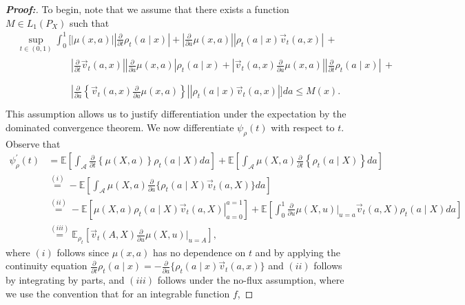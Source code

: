 \documentclass[11pt,twoside]{article}
\theoremstyle{definition}
\theoremstyle{remark}
\begin{document}
\begin{proof}[\textbf{Proof:}]

To begin, note that we assume that there exists a function $M \in L_1(P_X)$ such that
\begin{align*}
    &\sup_{t\in (0, 1)}\int_0^1
    \Bigg[|\mu(x,a)| \left| \frac{\partial}{\partial t} \rho_t(a\mid x) \right| + \left| \frac{\partial}{\partial a}\mu(x,a) \right| |\rho_t(a\mid x)\vec{v}_t(a,x)| \, +
        \\
    &\phantom{\sup_{t\in (0, 1)}\int_0^1
    \Bigg[} \left| \frac{\partial}{\partial t}\vec{v}_t(a,x) \right|\left| \frac{\partial}{\partial a}\mu(x,a) \right| \rho_t(a\mid x) + \left| \vec{v}_t(a,x) \frac{\partial}{\partial a}\mu(x,a) \right| \left| \frac{\partial}{\partial t} \rho_t(a\mid x) \right| \, +
        \\
&\phantom{\sup_{t\in (0, 1)}\int_0^1
    \Bigg[}
        \left|
            \frac{\partial}{\partial a}
            \left\{
                \vec{v}_t(a,x)
                \frac{\partial}{\partial a}\mu(x,a)
            \right\}
        \right|
        |\rho_t(a\mid x)\vec{v}_t(a,x)|
    \Bigg]da
    \leq
    M(x).
\end{align*}
This assumption allows us to justify differentiation under the expectation by the dominated convergence theorem. We now differentiate $\psi_\rho(t)$ with respect to $t$. Observe that
    \begin{align*}
         \psi^\prime_\rho(t) &= \mathbb{E} \! \left[ \int_{\mathcal{A}} \frac{\partial}{\partial t} \left\{ \mu(X, a) \right\} \rho_t(a \! \mid \! X) da \right] + \mathbb{E} \! \left[ \int_{\mathcal{A}}  \mu(X, a) \frac{\partial}{\partial t} \left\{  \rho_t(a \! \mid \! X) \right\}  da \right] \\
        &\overset{(i)}{=} - \mathbb{E} \! \left[ \int_{\mathcal{A}}  \mu(X, a) \frac{\partial}{\partial a} \big\{ \rho_t(a \! \mid \! X) \vec{v}_t(a, X) \big\}  da \right] \\
        &\overset{(ii)}{=}  - \mathbb{E}\left[\left. \mu(X,a) \rho_t(a\mid X)\vec{v}_t(a,X) \right|_{a=0}^{a=1} \right] + \mathbb{E}\left[ \int_0^1 \frac{\partial}{\partial u}  \mu(X, u) \Big|_{u = a}
        \vec{v}_t(a,X) \rho_t(a\mid X) da \right] \\
        &\overset{(iii)}{=} \mathbb{E}_{\rho_t} \! \left[ \vec{v}_t(A, X) \frac{\partial}{\partial u}  \mu(X, u) \Big|_{u = A} \right],
    \end{align*}
    where $(i)$ follows since $\mu(x, a)$ has no dependence on $t$ and by applying the continuity equation $\frac{\partial}{\partial t} \rho_t(a \! \mid \! x) = - \frac{\partial}{\partial a} \{ \rho_t(a \! \mid \! x) \vec{v}_t(a, x) \}$ and $(ii)$ follows by integrating by parts, and $(iii)$ follows under the no-flux assumption, where we use the convention that for an integrable function $f$,

\end{proof}
\end{document}
